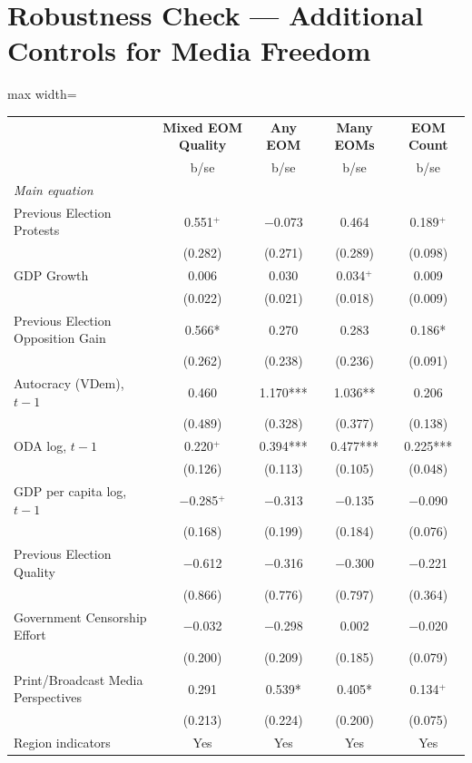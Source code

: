 \documentclass[USletter,12pt, titlepage]{article} %
\begin{document}
\section{Robustness Check --- Additional Controls for Media Freedom}
\begin{table}[H]
\centering
\begin{adjustbox}{max width=\textwidth}
\begin{threeparttable}
\begin{tabular}{lcccc}
\toprule
 & \textbf{Mixed EOM Quality} & \textbf{Any EOM} & \textbf{Many EOMs} & \textbf{EOM Count} \\
 & b/se & b/se & b/se & b/se \\
\midrule
\multicolumn{5}{l}{\textit{Main equation}} \\
\midrule
Previous Election Protests & 0.551$^{+}$ & $-$0.073 & 0.464 & 0.189$^{+}$ \\
 & (0.282) & (0.271) & (0.289) & (0.098) \\
GDP Growth & 0.006 & 0.030 & 0.034$^{+}$ & 0.009 \\
 & (0.022) & (0.021) & (0.018) & (0.009) \\
Previous Election Opposition Gain & 0.566* & 0.270 & 0.283 & 0.186* \\
 & (0.262) & (0.238) & (0.236) & (0.091) \\
Autocracy (VDem), $t-1$ & 0.460 & 1.170*** & 1.036** & 0.206 \\
 & (0.489) & (0.328) & (0.377) & (0.138) \\
ODA log, $t-1$ & 0.220$^{+}$ & 0.394*** & 0.477*** & 0.225*** \\
 & (0.126) & (0.113) & (0.105) & (0.048) \\
GDP per capita log, $t-1$ & $-$0.285$^{+}$ & $-$0.313 & $-$0.135 & $-$0.090 \\
 & (0.168) & (0.199) & (0.184) & (0.076) \\
Previous Election Quality & $-$0.612 & $-$0.316 & $-$0.300 & $-$0.221 \\
 & (0.866) & (0.776) & (0.797) & (0.364) \\
Government Censorship Effort & $-$0.032 & $-$0.298 & 0.002 & $-$0.020 \\
 & (0.200) & (0.209) & (0.185) & (0.079) \\
Print/Broadcast Media Perspectives & 0.291 & 0.539* & 0.405* & 0.134$^{+}$ \\
 & (0.213) & (0.224) & (0.200) & (0.075) \\
Region indicators & Yes & Yes & Yes & Yes \\

\end{tabular}
\end{threeparttable}
\end{adjustbox}
\end{table}
\end{document}

